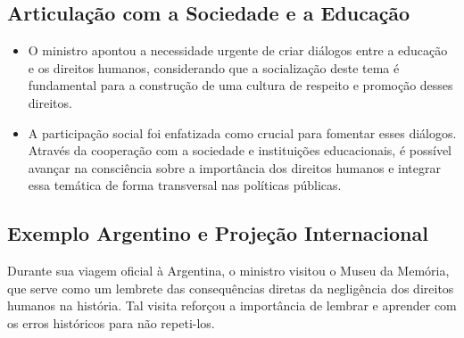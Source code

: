 \documentclass[
   article,       
   12pt,          
   oneside,       
   a4paper,       
   english,       
   brazil,        
   sumario=tradicional
   ]{abntex2}
\begin{document}
\subsection{Articulação com a Sociedade e a Educação}
\begin{itemize}
    \item O ministro apontou a necessidade urgente de criar diálogos entre a educação e os direitos humanos, considerando que a socialização deste tema é fundamental para a construção de uma cultura de respeito e promoção desses direitos.
    \item A participação social foi enfatizada como crucial para fomentar esses diálogos. Através da cooperação com a sociedade e instituições educacionais, é possível avançar na consciência sobre a importância dos direitos humanos e integrar essa temática de forma transversal nas políticas públicas.
\end{itemize}

\subsection{Exemplo Argentino e Projeção Internacional}
Durante sua viagem oficial à Argentina, o ministro visitou o Museu da Memória, que serve como um lembrete das consequências diretas da negligência dos direitos humanos na história. Tal visita reforçou a importância de lembrar e aprender com os erros históricos para não repeti-los.
\end{document}
